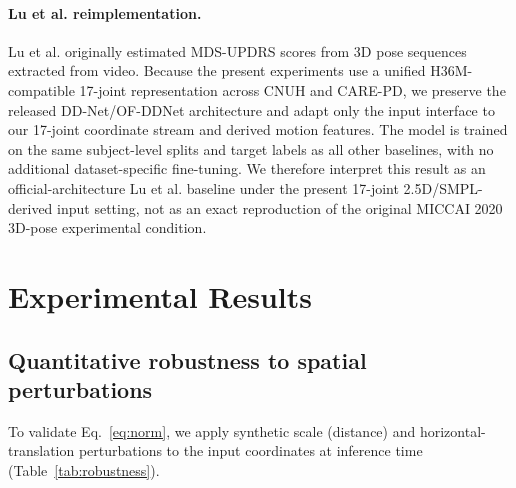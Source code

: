 \documentclass[preprint,12pt]{elsarticle}
\begin{document}
\paragraph{Lu et al. reimplementation.}
Lu et al. originally estimated MDS-UPDRS scores from 3D pose sequences
extracted from video. Because the present experiments use a unified
H36M-compatible 17-joint representation across CNUH and CARE-PD, we preserve
the released DD-Net/OF-DDNet architecture and adapt only the input interface to
our 17-joint coordinate stream and derived motion features. The model is trained
on the same subject-level splits and target labels as all other baselines, with
no additional dataset-specific fine-tuning. We therefore interpret this result
as an official-architecture Lu et al. baseline under the present 17-joint
2.5D/SMPL-derived input setting, not as an exact reproduction of the original
MICCAI 2020 3D-pose experimental condition.

\section{Experimental Results}
\label{sec:results}

\subsection{Quantitative robustness to spatial perturbations}
\label{sec:robust_exp}
To validate Eq.~\eqref{eq:norm}, we apply synthetic scale (distance) and
horizontal-translation perturbations to the input coordinates at inference time
(Table~\ref{tab:robustness}).

\begin{table}[htpb]
\centering
\caption{Robustness to affine scale (distance) and translation perturbations.
$\Delta$MAE is the relative change from each model's own unperturbed baseline.}
\label{tab:robustness}
\end{table}
\end{document}
